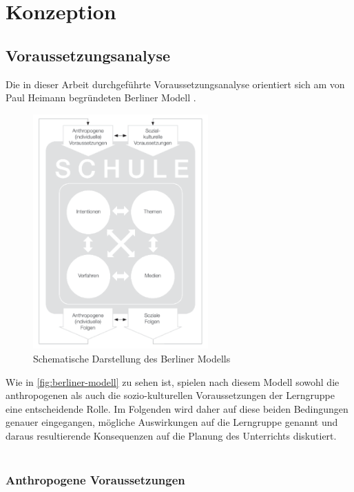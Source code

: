 \section{Konzeption}
\label{sec:konzeption}

\subsection{Voraussetzungsanalyse}
\label{subsec:voraussetzungsanalyse}

Die in dieser Arbeit durchgeführte Voraussetzungsanalyse orientiert sich am von Paul Heimann begründeten Berliner Modell \cite[S.~41--70]{arnold2015}.
\begin{figure}[h!]
	\centering
	\includegraphics[width=0.6\textwidth]{media/BerlinerModell.png}
	\caption{Schematische Darstellung des Berliner Modells \cite[S.~68]{arnold2015}}
	\label{fig:berliner-modell}
\end{figure}
Wie in \autoref{fig:berliner-modell} zu sehen ist, spielen nach diesem Modell sowohl die anthropogenen als auch die sozio-kulturellen Voraussetzungen der Lerngruppe eine entscheidende Rolle.
Im Folgenden wird daher auf diese beiden Bedingungen genauer eingegangen, mögliche Auswirkungen auf die Lerngruppe genannt und daraus resultierende Konsequenzen auf die Planung des Unterrichts diskutiert.\\\\

\subsubsection{Anthropogene Voraussetzungen}
\label{subsubsec:anthropogene-voraussetzungen}

